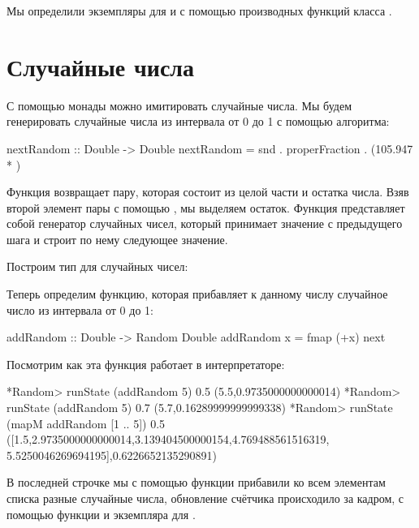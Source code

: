 Мы определили экземпляры для  и  с помощью
производных функций класса .

\section{Случайные числа}

С помощью монады  можно имитировать случайные числа. Мы будем
генерировать случайные числа из интервала от 0 до 1 с помощью алгоритма:


\begin{code}
nextRandom :: Double -> Double
nextRandom = snd . properFraction . (105.947 * )
\end{code}

Функция  возвращает пару, которая состоит из целой
части и остатка числа. Взяв второй элемент пары с помощью , мы
выделяем остаток. Функция  представляет собой генератор
случайных чисел, который принимает значение с предыдущего шага и строит
по нему следующее значение.

Построим тип для случайных чисел:



Теперь определим функцию, которая прибавляет к данному числу случайное
число из интервала от 0 до 1:


\begin{code}
addRandom :: Double -> Random Double
addRandom x = fmap (+x) next 
\end{code}

Посмотрим как эта функция работает в интерпретаторе:


\begin{code}
*Random> runState (addRandom 5) 0.5
(5.5,0.9735000000000014)
*Random> runState (addRandom 5) 0.7
(5.7,0.16289999999999338)
*Random> runState (mapM addRandom [1 .. 5]) 0.5
([1.5,2.9735000000000014,3.139404500000154,4.769488561516319,
 5.5250046269694195],0.6226652135290891)
\end{code}

В последней строчке мы с помощью функции  прибавили ко всем
элементам списка разные случайные числа, обновление счётчика происходило
за кадром, с помощью функции  и экземпляра  для
.

